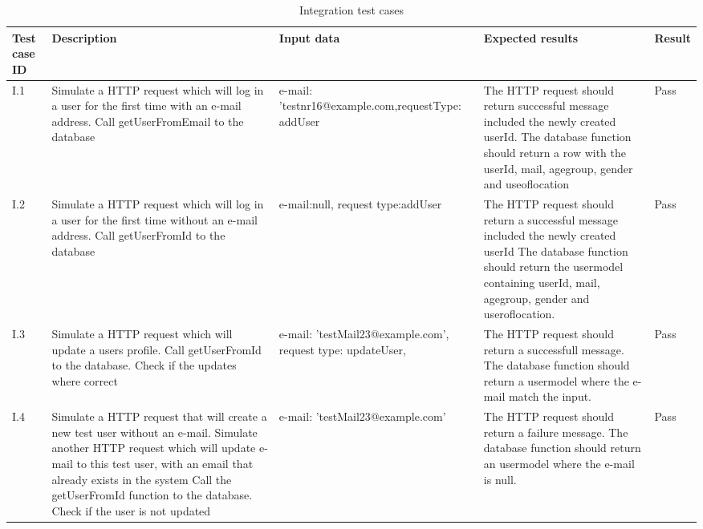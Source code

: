\begin{appendices}
\begin{center}
\begin{longtable}{ | p{1cm} | p{5.5cm} | p{4cm} | p{4.5cm} | p{2cm}|}
		\caption[Integration test cases]{Integration test cases} \label{Tab:integrationtestcases}\\
		\hline
		\textbf{Test case ID} & \textbf{Description} & \textbf{Input data} & \textbf{Expected results} & \textbf{Result} \\ \hline
		
		I.1 & Simulate a HTTP request which will log in a user for the first time with an e-mail address. \newline Call getUserFromEmail to the database & e-mail: 'testnr16@example.com,\newline requestType: addUser & The HTTP request should return successful message included the newly created userId. The database  function should return a row with the userId, mail, age\textunderscore group, gender and use\textunderscore of\textunderscore location  & Pass \\ \hline
		
		I.2 & Simulate a HTTP request which will log in a user for the first time without an e-mail address. \newline Call getUserFromId to the database & e-mail:null, \newline request type:addUser  & The HTTP request should return a successful message included the newly created userId The database function should return the usermodel containing userId, mail, age\textunderscore group, gender and user\textunderscore of\textunderscore location.  & Pass \\ \hline
		
		I.3 & Simulate a HTTP request which will update a users profile. \newline Call getUserFromId to the database.  \newline Check if the updates where correct & e-mail: 'testMail23@example.com', request type: updateUser,  & The HTTP request should return a successfull message. The database function should return a usermodel where the e-mail match the input.& Pass\\ \hline
		
		I.4 & Simulate a HTTP request that will create a new test user without an e-mail. Simulate another HTTP request which will update e-mail to this test user, with an email that already exists in the system \newline  Call the getUserFromId function to the database. \newline Check if the user is not updated & e-mail: 'testMail23@example.com' & The HTTP request should return a failure message. The database function should return an usermodel where the e-mail is null. & Pass\\ \hline
		

\end{longtable}
\end{center}
\end{appendices}
